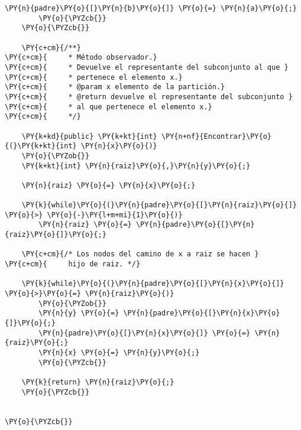 \begin{Verbatim}[commandchars=\\\{\}]
	 	\PY{n}{padre}\PY{o}{[}\PY{n}{b}\PY{o}{]} \PY{o}{=} \PY{n}{a}\PY{o}{;}
	    \PY{o}{\PYZcb{}}
    \PY{o}{\PYZcb{}}

    \PY{c+cm}{/**}
\PY{c+cm}{     * Método observador.}
\PY{c+cm}{     * Devuelve el representante del subconjunto al que }
\PY{c+cm}{     * pertenece el elemento x.}
\PY{c+cm}{     * @param x elemento de la partición.}
\PY{c+cm}{     * @return devuelve el representante del subconjunto }
\PY{c+cm}{     * al que pertenece el elemento x.}
\PY{c+cm}{     */}

    \PY{k+kd}{public} \PY{k+kt}{int} \PY{n+nf}{Encontrar}\PY{o}{(}\PY{k+kt}{int} \PY{n}{x}\PY{o}{)}
    \PY{o}{\PYZob{}}
	\PY{k+kt}{int} \PY{n}{raiz}\PY{o}{,}\PY{n}{y}\PY{o}{;}

	\PY{n}{raiz} \PY{o}{=} \PY{n}{x}\PY{o}{;}

	\PY{k}{while}\PY{o}{(}\PY{n}{padre}\PY{o}{[}\PY{n}{raiz}\PY{o}{]} \PY{o}{>} \PY{o}{-}\PY{l+m+mi}{1}\PY{o}{)}
	    \PY{n}{raiz} \PY{o}{=} \PY{n}{padre}\PY{o}{[}\PY{n}{raiz}\PY{o}{]}\PY{o}{;}

	\PY{c+cm}{/* Los nodos del camino de x a raiz se hacen }
\PY{c+cm}{	   hijo de raiz. */}
	
	\PY{k}{while}\PY{o}{(}\PY{n}{padre}\PY{o}{[}\PY{n}{x}\PY{o}{]} \PY{o}{>}\PY{o}{=} \PY{n}{raiz}\PY{o}{)}
	    \PY{o}{\PYZob{}}
	 	\PY{n}{y} \PY{o}{=} \PY{n}{padre}\PY{o}{[}\PY{n}{x}\PY{o}{]}\PY{o}{;}
	 	\PY{n}{padre}\PY{o}{[}\PY{n}{x}\PY{o}{]} \PY{o}{=} \PY{n}{raiz}\PY{o}{;}
	 	\PY{n}{x} \PY{o}{=} \PY{n}{y}\PY{o}{;}
	    \PY{o}{\PYZcb{}}

	\PY{k}{return} \PY{n}{raiz}\PY{o}{;}
    \PY{o}{\PYZcb{}}

    
\PY{o}{\PYZcb{}}
\end{Verbatim}
